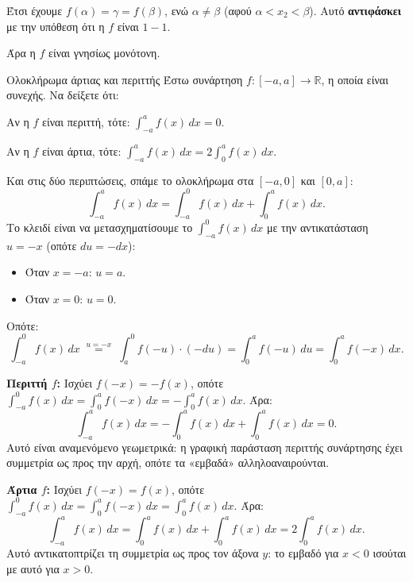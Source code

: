 Έτσι έχουμε $f(\alpha) = \gamma = f(\beta)$, ενώ $\alpha \neq \beta$
(αφού $\alpha < x_2 < \beta$). Αυτό \textbf{αντιφάσκει} με την υπόθεση ότι η $f$ είναι $1-1$.

Άρα η $f$ είναι γνησίως μονότονη.


\begin{Protashmabox}{Ολοκλήρωμα άρτιας και περιττής}
Έστω συνάρτηση $f:[-a,a]\to\mathbb{R}$, η οποία είναι συνεχής. Να δείξετε ότι:
\begin{alist}
  \item Αν η $f$ είναι περιττή, τότε:
        $\displaystyle\int_{-a}^{a} f(x)\,dx = 0$.
  \item Αν η $f$ είναι άρτια, τότε:
        $\displaystyle\int_{-a}^{a} f(x)\,dx = 2\int_{0}^{a} f(x)\,dx$.
\end{alist}
\end{Protashmabox}
\apodeixi

Και στις δύο περιπτώσεις, σπάμε το ολοκλήρωμα στα $[-a,0]$ και $[0,a]$:
\[
  \int_{-a}^{a} f(x)\,dx = \int_{-a}^{0} f(x)\,dx + \int_{0}^{a} f(x)\,dx.
\]
Το κλειδί είναι να μετασχηματίσουμε το $\displaystyle\int_{-a}^{0} f(x)\,dx$
με την αντικατάσταση $u = -x$ (οπότε $du = -dx$):
\begin{itemize}
  \item Όταν $x = -a$: $u = a$.
  \item Όταν $x = 0$: $u = 0$.
\end{itemize}
Οπότε:
\[
  \int_{-a}^{0} f(x)\,dx
  \;\overset{u=-x}{=}\;
  \int_{a}^{0} f(-u)\cdot(-du)
  = \int_{0}^{a} f(-u)\,du
  = \int_{0}^{a} f(-x)\,dx.
\]

\begin{alist}
  \item \textbf{Περιττή $f$:} Ισχύει $f(-x) = -f(x)$, οπότε
  $\displaystyle\int_{-a}^{0} f(x)\,dx = \int_{0}^{a} f(-x)\,dx = -\int_{0}^{a} f(x)\,dx$.
  Άρα:
  \[
    \int_{-a}^{a} f(x)\,dx
    = -\int_{0}^{a} f(x)\,dx + \int_{0}^{a} f(x)\,dx = 0.
  \]
  Αυτό είναι αναμενόμενο γεωμετρικά: η γραφική παράσταση περιττής συνάρτησης
  έχει συμμετρία ως προς την αρχή, οπότε τα «εμβαδά» αλληλοαναιρούνται.

  \item \textbf{Άρτια $f$:} Ισχύει $f(-x) = f(x)$, οπότε
  $\displaystyle\int_{-a}^{0} f(x)\,dx = \int_{0}^{a} f(-x)\,dx = \int_{0}^{a} f(x)\,dx$.
  Άρα:
  \[
    \int_{-a}^{a} f(x)\,dx
    = \int_{0}^{a} f(x)\,dx + \int_{0}^{a} f(x)\,dx
    = 2\int_{0}^{a} f(x)\,dx.
  \]
  Αυτό αντικατοπτρίζει τη συμμετρία ως προς τον άξονα $y$: το εμβαδό για $x < 0$
  ισούται με αυτό για $x > 0$.
\end{alist}


